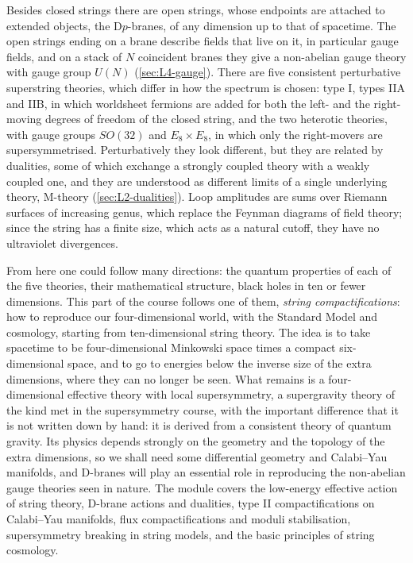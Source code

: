 Besides closed strings there are open strings, whose endpoints are attached to extended objects, the D$p$-branes, of any dimension up to that of spacetime. The open strings ending on a brane describe fields that live on it, in particular gauge fields, and on a stack of $N$ coincident branes they give a non-abelian gauge theory with gauge group $U(N)$ (\cref{sec:L4-gauge}).
There are five consistent perturbative superstring theories, which differ in how the spectrum is chosen: type I, types IIA and IIB, in which worldsheet fermions are added for both the left- and the right-moving degrees of freedom of the closed string, and the two heterotic theories, with gauge groups $SO(32)$ and $E_8\times E_8$, in which only the right-movers are supersymmetrised. Perturbatively they look different, but they are related by dualities, some of which exchange a strongly coupled theory with a weakly coupled one, and they are understood as different limits of a single underlying theory, M-theory (\cref{sec:L2-dualities}). Loop amplitudes are sums over Riemann surfaces of increasing genus, which replace the Feynman diagrams of field theory; since the string has a finite size, which acts as a natural cutoff, they have no ultraviolet divergences.

From here one could follow many directions: the quantum properties of each of the five theories, their mathematical structure, black holes in ten or fewer dimensions. This part of the course follows one of them, \emph{string compactifications}: how to reproduce our four-dimensional world, with the Standard Model and cosmology, starting from ten-dimensional string theory. The idea is to take spacetime to be four-dimensional Minkowski space times a compact six-dimensional space, and to go to energies below the inverse size of the extra dimensions, where they can no longer be seen. What remains is a four-dimensional effective theory with local supersymmetry, a supergravity theory of the kind met in the supersymmetry course, with the important difference that it is not written down by hand: it is derived from a consistent theory of quantum gravity. Its physics depends strongly on the geometry and the topology of the extra dimensions, so we shall need some differential geometry and Calabi--Yau manifolds, and D-branes will play an essential role in reproducing the non-abelian gauge theories seen in nature. The module covers the low-energy effective action of string theory, D-brane actions and dualities, type II compactifications on Calabi--Yau manifolds, flux compactifications and moduli stabilisation, supersymmetry breaking in string models, and the basic principles of string cosmology.

